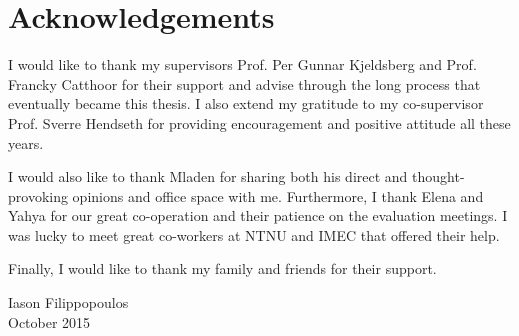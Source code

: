 \bigskip
\bigskip

\section*{Acknowledgements}

\bigskip

I would like to thank my supervisors Prof. Per Gunnar Kjeldsberg and Prof. Francky Catthoor for their support and advise through the long process that eventually became this thesis. 
I also extend my gratitude to my co-supervisor Prof. Sverre Hendseth for providing encouragement and positive attitude all these years.

I would also like to thank Mladen for sharing both his direct and thought-provoking opinions and office space with me.
Furthermore, I thank Elena and Yahya for our great co-operation and their patience on the evaluation meetings.
I was lucky to meet great co-workers at NTNU and IMEC that offered their help. 

Finally, I would like to thank my family and friends for their support. 

\bigskip

\begin{flushright}
Iason Filippopoulos \\
October 2015
\end{flushright}

\vspace*{\fill}
